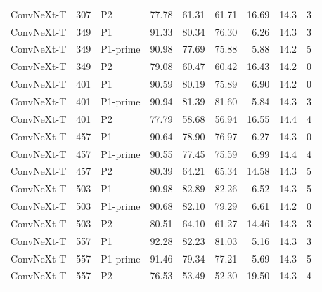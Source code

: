 {\begin{longtable}{lrlrrrrrr}
ConvNeXt-T & 307 & P2 & 77.78 & 61.31 & 61.71 & 16.69 & 14.3 & 3 \\
ConvNeXt-T & 349 & P1 & 91.33 & 80.34 & 76.30 & 6.26 & 14.3 & 3 \\
ConvNeXt-T & 349 & P1-prime & 90.98 & 77.69 & 75.88 & 5.88 & 14.2 & 5 \\
ConvNeXt-T & 349 & P2 & 79.08 & 60.47 & 60.42 & 16.43 & 14.2 & 0 \\
ConvNeXt-T & 401 & P1 & 90.59 & 80.19 & 75.89 & 6.90 & 14.2 & 0 \\
ConvNeXt-T & 401 & P1-prime & 90.94 & 81.39 & 81.60 & 5.84 & 14.3 & 3 \\
ConvNeXt-T & 401 & P2 & 77.79 & 58.68 & 56.94 & 16.55 & 14.4 & 4 \\
ConvNeXt-T & 457 & P1 & 90.64 & 78.90 & 76.97 & 6.27 & 14.3 & 0 \\
ConvNeXt-T & 457 & P1-prime & 90.55 & 77.45 & 75.59 & 6.99 & 14.4 & 4 \\
ConvNeXt-T & 457 & P2 & 80.39 & 64.21 & 65.34 & 14.58 & 14.3 & 5 \\
ConvNeXt-T & 503 & P1 & 90.98 & 82.89 & 82.26 & 6.52 & 14.3 & 5 \\
ConvNeXt-T & 503 & P1-prime & 90.68 & 82.10 & 79.29 & 6.61 & 14.2 & 0 \\
ConvNeXt-T & 503 & P2 & 80.51 & 64.10 & 61.27 & 14.46 & 14.3 & 3 \\
ConvNeXt-T & 557 & P1 & 92.28 & 82.23 & 81.03 & 5.16 & 14.3 & 3 \\
ConvNeXt-T & 557 & P1-prime & 91.46 & 79.34 & 77.21 & 5.69 & 14.3 & 5 \\
ConvNeXt-T & 557 & P2 & 76.53 & 53.49 & 52.30 & 19.50 & 14.3 & 4 \\
\end{longtable}
}
